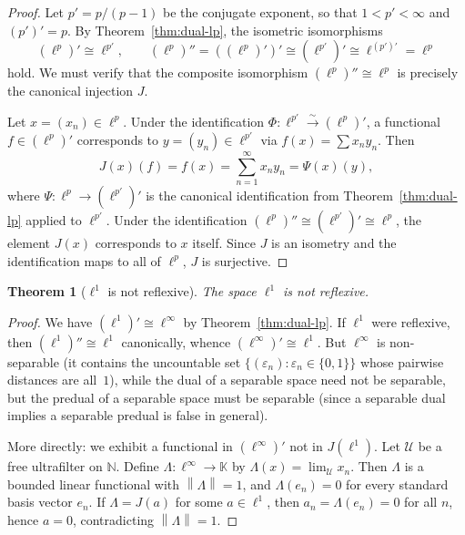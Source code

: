 \documentclass[a4paper,12pt]{book}
\newcommand{\N}{\mathbb{N}}
\newcommand{\K}{\mathbb{K}}
\newcommand{\norm}[1]{\left\| #1 \right\|}
\theoremstyle{definition}
\theoremstyle{plain}
\newtheorem{theorem}[definition]{Theorem}
\theoremstyle{remark}
\begin{document}
\begin{proof}
Let $p' = p/(p-1)$ be the conjugate exponent, so that $1<p'<\infty$ and
$(p')' = p$.  By Theorem~\ref{thm:dual-lp}, the isometric isomorphisms
\[
  (\ell^p)' \cong \ell^{p'}, \qquad
  (\ell^p)'' = ((\ell^p)')' \cong (\ell^{p'})' \cong \ell^{(p')'} = \ell^p
\]
hold.  We must verify that the composite isomorphism $(\ell^p)''\cong\ell^p$
is precisely the canonical injection $J$.

Let $x = (x_n)\in\ell^p$.  Under the identification
$\Phi: \ell^{p'}\xrightarrow{\sim}(\ell^p)'$, a functional $f\in(\ell^p)'$
corresponds to $y = (y_n)\in\ell^{p'}$ via $f(x)=\sum x_n y_n$.  Then
\[
  J(x)(f) = f(x) = \sum_{n=1}^\infty x_n y_n = \Psi(x)(y),
\]
where $\Psi:\ell^p\to(\ell^{p'})'$ is the canonical identification from
Theorem~\ref{thm:dual-lp} applied to $\ell^{p'}$.  Under the identification
$(\ell^p)'' \cong (\ell^{p'})' \cong \ell^p$, the element $J(x)$ corresponds
to $x$ itself.  Since $J$ is an isometry and the identification maps to all of
$\ell^p$, $J$ is surjective.
\end{proof}

\begin{theorem}[$\ell^1$ is not reflexive]\label{thm:l1-not-reflexive}
The space $\ell^1$ is not reflexive.
\end{theorem}

\begin{proof}
We have $(\ell^1)' \cong \ell^\infty$ by Theorem~\ref{thm:dual-lp}.
If $\ell^1$ were reflexive, then $(\ell^1)'' \cong \ell^1$ canonically,
whence $(\ell^\infty)' \cong \ell^1$.  But $\ell^\infty$ is non-separable
(it contains the uncountable set $\{(\varepsilon_n):\varepsilon_n\in\{0,1\}\}$
whose pairwise distances are all~$1$), while the dual of a separable space
need not be separable, but the predual of a separable space must be separable
(since a separable dual implies a separable predual is false in general).

More directly: we exhibit a functional in $(\ell^\infty)'$ not in $J(\ell^1)$.
Let $\mathcal{U}$ be a free ultrafilter on $\N$.  Define
$\Lambda:\ell^\infty\to\K$ by $\Lambda(x) = \lim_\mathcal{U} x_n$.  Then
$\Lambda$ is a bounded linear functional with $\norm{\Lambda}=1$, and
$\Lambda(e_n)=0$ for every standard basis vector $e_n$.  If $\Lambda = J(a)$
for some $a\in\ell^1$, then $a_n = \Lambda(e_n) = 0$ for all $n$, hence
$a=0$, contradicting $\norm{\Lambda}=1$.
\end{proof}
\end{document}
